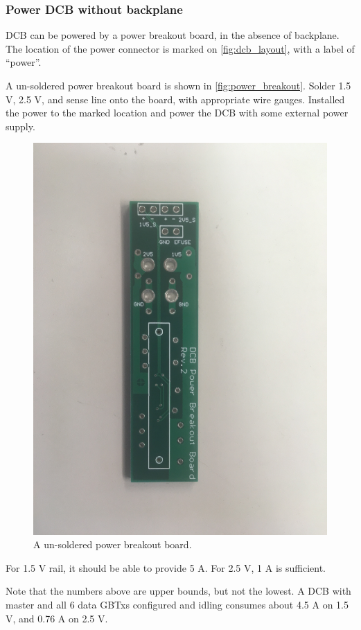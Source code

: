 \subsubsection{Power DCB without backplane}
DCB can be powered by a power breakout board, in the absence of backplane.
The location of the power connector is marked on \autoref{fig:dcb_layout}, with
a label of ``power''.

A un-soldered power breakout board is shown in \autoref{fig:power_breakout}.
Solder 1.5 V, 2.5 V, and sense line onto the board, with appropriate wire
gauges.
Installed the power to the marked location and power the DCB with some external
power supply.

\begin{figure}[!ht]
\centering
\includegraphics[width=0.9\linewidth]{res/power_breakout_board.jpg}
\caption{A un-soldered power breakout board.}
\label{fig:power_breakout}
\end{figure}

\begin{leftbar}
    For 1.5 V rail, it should be able to provide 5 A.
    For 2.5 V, 1 A is sufficient.

    Note that the numbers above are upper bounds, but not the lowest.
    A DCB with master and all 6 data GBTxs configured and idling consumes about
    4.5 A on 1.5 V, and 0.76 A on 2.5 V.
\end{leftbar}

